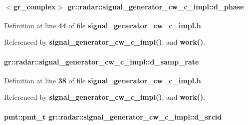 \paragraph[{d\+\_\+phase}]{$<$gr\+\_\+complex$>$ gr\+::radar\+::signal\+\_\+generator\+\_\+cw\+\_\+c\+\_\+impl\+::d\+\_\+phase}\label{classgr_1_1radar_1_1signal__generator__cw__c__impl_afe857e76cbe8344658f64aaad60a18fc}


Definition at line {\bf 44} of file {\bf signal\+\_\+generator\+\_\+cw\+\_\+c\+\_\+impl.\+h}.



Referenced by {\bf signal\+\_\+generator\+\_\+cw\+\_\+c\+\_\+impl()}, and {\bf work()}.

\paragraph[{d\+\_\+samp\+\_\+rate}]{ gr\+::radar\+::signal\+\_\+generator\+\_\+cw\+\_\+c\+\_\+impl\+::d\+\_\+samp\+\_\+rate}\label{classgr_1_1radar_1_1signal__generator__cw__c__impl_a504a2468b0dac4be4efc7a4a22840de7}


Definition at line {\bf 38} of file {\bf signal\+\_\+generator\+\_\+cw\+\_\+c\+\_\+impl.\+h}.



Referenced by {\bf signal\+\_\+generator\+\_\+cw\+\_\+c\+\_\+impl()}, and {\bf work()}.

\paragraph[{d\+\_\+srcid}]{\setlength{\rightskip}{0pt plus 5cm}pmt\+::pmt\+\_\+t gr\+::radar\+::signal\+\_\+generator\+\_\+cw\+\_\+c\+\_\+impl\+::d\+\_\+srcid}\label{classgr_1_1radar_1_1signal__generator__cw__c__impl_afaea0c8b0ffc64633edaf0df2ab05e84}


